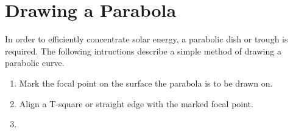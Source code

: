 \documentclass{article}
\begin{document}
    \section{Drawing a Parabola}
        In order to efficiently concentrate solar energy, a parabolic dish or trough is required.  The following intructions describe a simple method of drawing a parabolic curve.\cite{Parabola}
        \begin{enumerate}
            \item \begin{minipage}[t]{\linewidth}
                \raggedright
      
                \medskip
                Mark the focal point on the surface the parabola is to be drawn on.
            \end{minipage}
            \item \begin{minipage}[t]{\linewidth}
            \raggedright
  
            \medskip
            Align a T-square or straight edge with the marked focal point.
            \end{minipage}
            \item \begin{minipage}[t]{\linewidth}
                \raggedright


\end{minipage}
\end{enumerate}
\end{document}
